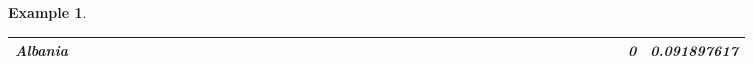 \documentclass[a4paper,11pt]{report}
\newtheorem{example}[theorem]{Example}
\begin{document}
\begin{example}
\begin{appendices}
\begin{landscape}
\begin{longtable}{r|r|r|r|r|r|r|r|r|r|r|r|r|r|r|r|r|r|r|r|r|r|r|r|r|r|r|r|r|r|r|r|r|r|r|r|r|r|r|r|r|r|}
\multicolumn{1}{|r|}{\textbf{Albania}}         &                                       &                                       &                                       &                                          &                                       &                                       &                                       &                                       &                                                &                                       &                                      &                                       &                                       &                                      &                                       &                                       &                                       &                                      &                                     &                                      &                                         &                                     &                                       &                                          &                                      &                                      &                                        &                                       &                                      &                                          &                                        &                                     &                                      &                                           &                                               &                                       &                                              &                                      &                                     & 0                                             & 0.091897617                             \\ \hline

\end{longtable}
\end{landscape}
\end{appendices}
\end{example}
\end{document}
